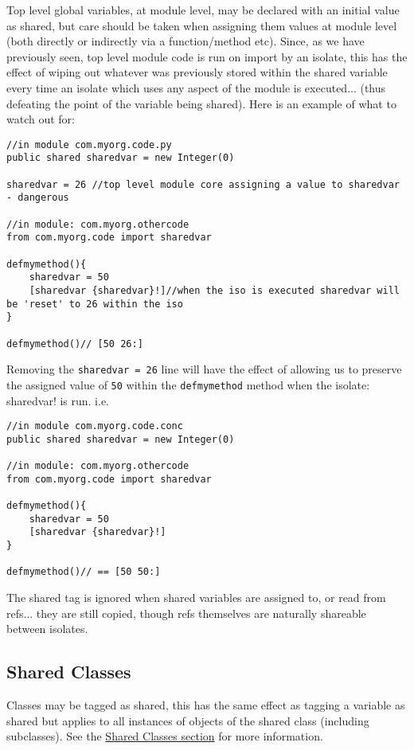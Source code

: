\documentclass[conc-doc]{subfiles}
\begin{document}
Top level global variables, at module level, may be declared with an initial value as shared, but care should be taken when assigning them values at module level (both directly or indirectly via a function/method etc). Since, as we have previously seen, top level module code is run on import by an isolate, this has the effect of wiping out whatever was previously stored within the shared variable every time an isolate which uses any aspect of the module is executed... (thus defeating the point of the variable being shared). Here is an example of what to watch out for:

\begin{lstlisting}
//in module com.myorg.code.py
public shared sharedvar = new Integer(0)

sharedvar = 26 //top level module core assigning a value to sharedvar - dangerous

//in module: com.myorg.othercode
from com.myorg.code import sharedvar

defmymethod(){
	sharedvar = 50
	[sharedvar {sharedvar}!]//when the iso is executed sharedvar will be 'reset' to 26 within the iso
}

defmymethod()// [50 26:]
\end{lstlisting}

Removing the \lstinline{sharedvar = 26} line will have the effect of allowing us to preserve the assigned value of \lstinline{50} within the \lstinline{defmymethod} method when the isolate: {sharedvar}! is run. i.e.

\begin{lstlisting}
//in module com.myorg.code.conc
public shared sharedvar = new Integer(0)

//in module: com.myorg.othercode
from com.myorg.code import sharedvar

defmymethod(){
	sharedvar = 50
	[sharedvar {sharedvar}!]
}

defmymethod()// == [50 50:]
\end{lstlisting}

The shared tag is ignored when shared variables are assigned to, or read from refs... they are still copied, though refs themselves are naturally shareable between isolates.

\subsection{Shared Classes}
Classes may be tagged as shared, this has the same effect as tagging a variable as shared but applies to all instances of objects of the shared class (including subclasses). See the \hyperref[sec:sharedClasses]{Shared Classes section} for more information.
\end{document}
